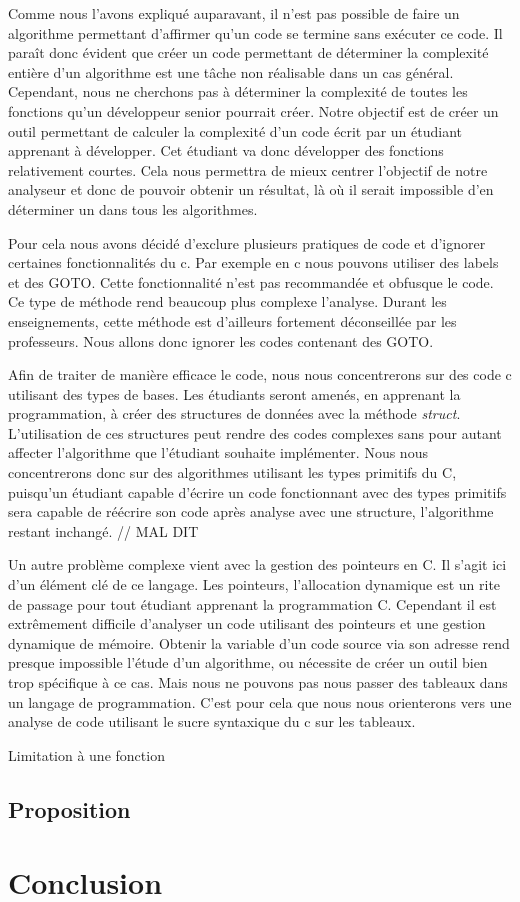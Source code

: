 \documentclass[12pt, twoside, openright]{report}
\begin{document}
Comme nous l'avons expliqué auparavant, il n'est pas possible de faire un algorithme permettant d'affirmer qu'un code se termine sans exécuter ce code. Il paraît donc évident que créer un code permettant de déterminer la complexité entière d'un algorithme est une tâche non réalisable dans un cas général. Cependant, nous ne cherchons pas à déterminer la complexité de toutes les fonctions qu'un développeur senior pourrait créer. Notre objectif est de créer un outil permettant de calculer la complexité d'un code écrit par un étudiant apprenant à développer. Cet étudiant va donc développer des fonctions relativement courtes. Cela nous permettra de mieux centrer l'objectif de notre analyseur et donc de pouvoir obtenir un résultat, là où il serait impossible d'en déterminer un dans tous les algorithmes.

Pour cela nous avons décidé d'exclure plusieurs pratiques de code et d'ignorer certaines fonctionnalités du c. Par exemple en c nous pouvons utiliser des labels et des GOTO. Cette fonctionnalité n'est pas recommandée et obfusque le code. Ce type de méthode rend beaucoup plus complexe l'analyse. Durant les enseignements, cette méthode est d'ailleurs fortement déconseillée par les professeurs. Nous allons donc ignorer les codes contenant des GOTO.

Afin de traiter de manière efficace le code, nous nous concentrerons sur des code c utilisant des types de bases. Les étudiants seront amenés, en apprenant la programmation, à créer des structures de données avec la méthode \textit{struct}. L'utilisation de ces structures peut rendre des codes complexes sans pour autant affecter l'algorithme que l'étudiant souhaite implémenter. Nous nous concentrerons donc sur des algorithmes utilisant les types primitifs du C, puisqu'un étudiant capable d'écrire un code fonctionnant avec des types primitifs sera capable de réécrire son code après analyse avec une structure, l'algorithme restant inchangé. // MAL DIT

Un autre problème complexe vient avec la gestion des pointeurs en C. Il s'agit ici d'un élément clé de ce langage. Les pointeurs, l'allocation dynamique est un rite de passage pour tout étudiant apprenant la programmation C. Cependant il est extrêmement difficile d'analyser un code utilisant des pointeurs et une gestion dynamique de mémoire. Obtenir la variable d'un code source via son adresse rend presque impossible l'étude d'un algorithme, ou nécessite de créer un outil bien trop spécifique à ce cas. Mais nous ne pouvons pas nous passer des tableaux dans un langage de programmation.  C'est pour cela que nous nous orienterons vers une analyse de code utilisant le sucre syntaxique du c sur les tableaux.

Limitation à une fonction %

\section{Proposition}



\chapter{Conclusion}

\tableofcontents
\printbibliography
\end{document}
